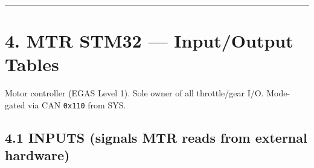 \documentclass[12pt,a4paper,oneside]{report}
\begin{document}
\begin{center}\rule{0.5\linewidth}{0.5pt}\end{center}

\section{4. MTR STM32 --- Input/Output
Tables}\label{mtr-stm32-inputoutput-tables}

Motor controller (EGAS Level 1). Sole owner of all throttle/gear I/O. Mode-gated
via CAN \texttt{0x110} from SYS.

\subsection{4.1 INPUTS (signals MTR reads from external
hardware)}\label{inputs-signals-mtr-reads-from-external-hardware}
\end{document}
